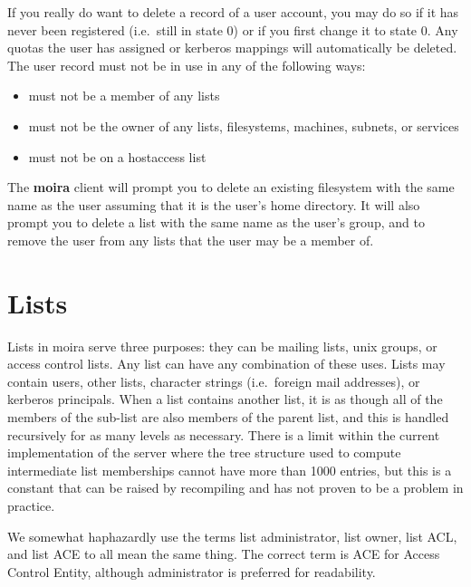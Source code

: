 If you really do want to delete a record of a user account, you may do
so if it has never been registered (i.e.\ still in state 0) or if you
first change it to state 0.  Any quotas the user has assigned or
kerberos mappings will automatically be deleted.  The user record must
not be in use in any of the following ways:
\begin{itemize}
\item must not be a member of any lists
\item must not be the owner of any lists, filesystems, machines,
subnets, or services
\item must not be on a hostaccess list
\end{itemize}
The {\bf moira} client will prompt you to delete an existing filesystem
with the same name as the user assuming that it is the user's home
directory.  It will also prompt you to delete a list with the same
name as the user's group, and to remove the user from any lists that
the user may be a member of.


\section{Lists}
\label{lists}

Lists in moira serve three purposes: they can be mailing lists,
{\sc unix} groups, or access control lists.  Any list can have any
combination of these uses.  Lists may contain users, other lists,
character strings (i.e.\ foreign mail addresses), or kerberos
principals.  When a list contains another list, it is as though all of
the members of the sub-list are also members of the parent list, and
this is handled recursively for as many levels as necessary.  There is
a limit within the current implementation of the server where the tree
structure used to compute intermediate list memberships cannot have
more than 1000 entries, but this is a constant that can be raised by
recompiling and has not proven to be a problem in practice.

We somewhat haphazardly use the terms list administrator, list owner,
list ACL, and list ACE to all mean the same thing.  The correct term
is ACE  for Access Control
Entity, although administrator is preferred for readability.

